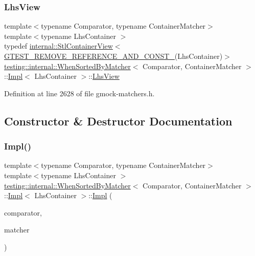 \subsubsection{\texorpdfstring{Lhs\+View}{LhsView}}
{\footnotesize\ttfamily template$<$typename Comparator, typename Container\+Matcher$>$ \\
template$<$typename Lhs\+Container $>$ \\
typedef \hyperlink{classtesting_1_1internal_1_1StlContainerView}{internal\+::\+Stl\+Container\+View}$<$ \hyperlink{gtest-internal_8h_a874567b176266188fabfffb8393267ce}{G\+T\+E\+S\+T\+\_\+\+R\+E\+M\+O\+V\+E\+\_\+\+R\+E\+F\+E\+R\+E\+N\+C\+E\+\_\+\+A\+N\+D\+\_\+\+C\+O\+N\+S\+T\+\_\+}(Lhs\+Container)$>$ \hyperlink{classtesting_1_1internal_1_1WhenSortedByMatcher}{testing\+::internal\+::\+When\+Sorted\+By\+Matcher}$<$ Comparator, Container\+Matcher $>$\+::\hyperlink{classtesting_1_1internal_1_1WhenSortedByMatcher_1_1Impl}{Impl}$<$ Lhs\+Container $>$\+::\hyperlink{classtesting_1_1internal_1_1WhenSortedByMatcher_1_1Impl_a4c84fddfe1bf967a73e5dae1940db427}{Lhs\+View}}



Definition at line 2628 of file gmock-\/matchers.\+h.



\subsection{Constructor \& Destructor Documentation}
\mbox{\label{classtesting_1_1internal_1_1WhenSortedByMatcher_1_1Impl_a63235e98dec5478b7ff9d06f6babc716}} 
\subsubsection{\texorpdfstring{Impl()}{Impl()}}
{\footnotesize\ttfamily template$<$typename Comparator, typename Container\+Matcher$>$ \\
template$<$typename Lhs\+Container $>$ \\
\hyperlink{classtesting_1_1internal_1_1WhenSortedByMatcher}{testing\+::internal\+::\+When\+Sorted\+By\+Matcher}$<$ Comparator, Container\+Matcher $>$\+::\hyperlink{classtesting_1_1internal_1_1WhenSortedByMatcher_1_1Impl}{Impl}$<$ Lhs\+Container $>$\+::\hyperlink{classtesting_1_1internal_1_1WhenSortedByMatcher_1_1Impl}{Impl} (\begin{DoxyParamCaption}\item[{const Comparator \&}]{comparator,  }\item[{const Container\+Matcher \&}]{matcher }\end{DoxyParamCaption})\hspace{0.3cm}{\ttfamily [inline]}}



